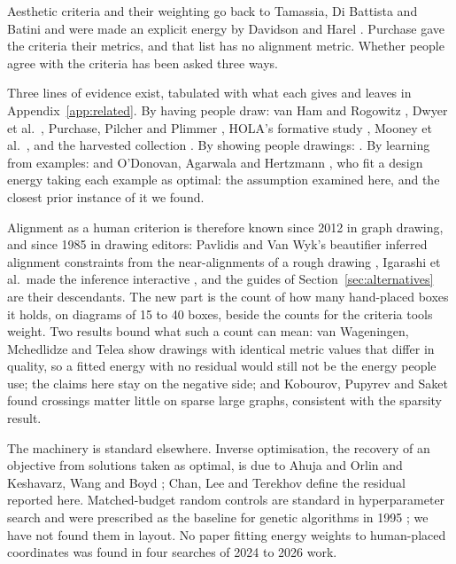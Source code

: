 \documentclass[a4paper,UKenglish]{gd-lipics-v3}
\begin{document}
Aesthetic criteria and their weighting go back to Tamassia, Di Battista and Batini
\cite{tdb88} and were made an explicit energy by Davidson and Harel \cite{dh96}. Purchase
\cite{purchase02} gave the criteria their metrics, and that list has no alignment metric.
Whether people agree with the criteria has been asked three ways.

Three lines of evidence exist, tabulated with what each gives and leaves in
Appendix~\ref{app:related}. By having people draw: van Ham and Rogowitz \cite{vanham08},
Dwyer et al.\ \cite{dwyer09}, Purchase, Pilcher and Plimmer \cite{purchase12}, HOLA's
formative study \cite{hola16}, Mooney et al.\ \cite{mooney25}, and the harvested
collection \cite{gdcoll25}. By showing people drawings: \cite{purchase20, klammler19}. By
learning from examples: \cite{masui94, spoenemann14, flud22, zhang26, deepgd21} and
O'Donovan, Agarwala and Hertzmann \cite{odonovan14}, who fit a design energy taking
each example as optimal: the assumption examined here, and the closest prior instance
of it we found.

Alignment as a human criterion is therefore known since 2012 in graph drawing, and since
1985 in drawing editors: Pavlidis and Van Wyk's beautifier inferred alignment constraints
from the near-alignments of a rough drawing \cite{pvw85}, Igarashi et al.\ made the
inference interactive \cite{igarashi97}, and the guides of
Section~\ref{sec:alternatives} are their descendants. The new part is the count
of how many hand-placed boxes it holds, on diagrams of 15 to 40 boxes, beside the counts for
the criteria tools weight. Two results bound what such a count can mean: van Wageningen,
Mchedlidze and Telea \cite{wageningen25} show drawings with identical metric values that
differ in quality, so a fitted energy with no residual would still not be the energy people
use; the claims here stay on the negative side; and Kobourov, Pupyrev and Saket
\cite{kobourov14} found crossings matter little on sparse large graphs, consistent with the
sparsity result.

The machinery is standard elsewhere. Inverse optimisation, the recovery of an objective from
solutions taken as optimal, is due to Ahuja and Orlin \cite{ahuja01} and Keshavarz, Wang
and Boyd \cite{keshavarz11}; Chan, Lee and Terekhov \cite{chan19} define the residual
reported here. Matched-budget random
controls are standard in hyperparameter search \cite{bergstra12} and were prescribed as the
baseline for genetic algorithms in 1995 \cite{jw95}; we have not found them in layout. No
paper fitting energy weights to human-placed coordinates was found in four searches of 2024
to 2026 work.
\end{document}
